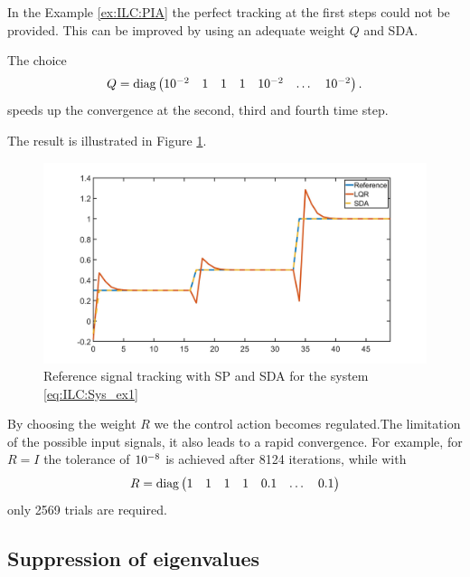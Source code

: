 \begin{exam}
	In the Example \ref{ex:ILC:PIA} the perfect tracking at the first steps could not be provided. 
	This can be improved by using an adequate weight $Q$ and SDA.
	
	The choice 
	\begin{align}
	Q =  \operatorname*{diag} \begin{pmatrix}
		10^{-2} & 1 & 1 & 1 & 10^{-2} & \dots &10^{-2}
	\end{pmatrix}.
	\end{align}
	speeds up the convergence at the second, third and fourth time step. 
	
	The result is illustrated in Figure \ref{img:ILC:Ex1_SDA}. 

	\begin{figure}[ht]
		\centering
	\includegraphics[width=\textwidth]{fig/Ex1_SDA.jpg}
	\caption{Reference signal tracking with SP and SDA for the system \eqref{eq:ILC:Sys_ex1}}
	\label{img:ILC:Ex1_SDA}
\end{figure}

By choosing the weight $R$ we the control action becomes regulated.The limitation of the possible input signals, it also leads to a rapid convergence. For example, for $R = I$ the tolerance of $10^{-8}$ is achieved after 8124 iterations, while with 
\begin{align}
R = \operatorname*{diag} \begin{pmatrix}
1& 1 & 1 & 1 & 0.1 & \dots & 0.1
\end{pmatrix}
\end{align}
only 2569 trials are required. 

\end{exam}


\subsection{Suppression of eigenvalues} 

